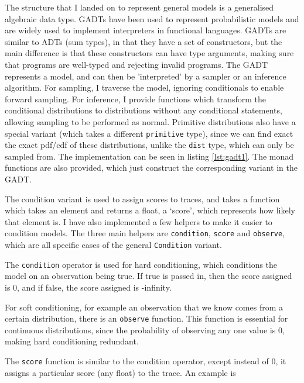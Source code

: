 The structure that I landed on to represent general models is a generalised algebraic data type. GADTs have been used to represent probabilistic models \cite{scibior2015practical} and are widely used to implement interpreters in functional languages. GADTs are similar to ADTs (sum types), in that they have a set of constructors, but the main difference is that these constructors can have type arguments, making sure that programs are well-typed and rejecting invalid programs. The GADT represents a model, and can then be 'interpreted' by a sampler or an inference algorithm. For sampling, I traverse the model, ignoring conditionals to enable forward sampling. For inference, I provide functions which transform the conditional distributions to distributions without any conditional statements, allowing sampling to be performed as normal. Primitive distributions also have a special variant (which takes a different \texttt{primitive} type), since we can find exact the exact pdf/cdf of these distributions, unlike the \texttt{dist} type, which can only be sampled from. The implementation can be seen in listing \ref{lst:gadt1}. The monad functions are also provided, which just construct the corresponding variant in the GADT.




The condition variant is used to assign scores to traces, and takes a function which takes an element and returns a float, a `score', which represents how likely that element is. I have also implemented a few helpers to make it easier to condition models. The three main helpers are \texttt{condition}, \texttt{score} and \texttt{observe}, which are all specific cases of the general \texttt{Condition} variant. 

The \texttt{condition} operator is used for hard conditioning, which conditions the model on an observation being true. If true is passed in, then the score assigned is 0, and if false, the score assigned is -infinity.

For soft conditioning, for example an observation that we know comes from a certain distribution, there is an \texttt{observe} function. This function is essential for continuous distributions, since the probability of observing any one value is 0, making hard conditioning redundant.

The \texttt{score} function is similar to the condition operator, except instead of 0, it assigns a particular score (any float) to the trace. An example is %


